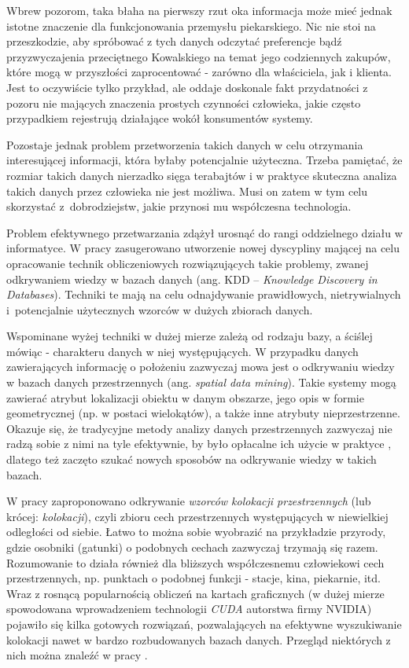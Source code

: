 \documentclass[12pt]{article}
\begin{document}
Wbrew pozorom, taka błaha na pierwszy rzut oka informacja może mieć jednak istotne znaczenie dla funkcjonowania przemysłu piekarskiego. Nic nie stoi na przeszkodzie, aby spróbować z tych danych odczytać preferencje bądź przyzwyczajenia przeciętnego Kowalskiego na temat jego codziennych zakupów, które mogą w przyszłości zaprocentować - zarówno dla właściciela, jak i klienta. Jest to oczywiście tylko przykład, ale oddaje doskonale fakt przydatności z pozoru nie mających znaczenia prostych czynności człowieka, jakie często przypadkiem rejestrują działające wokół konsumentów systemy.

Pozostaje jednak problem przetworzenia takich danych w celu otrzymania interesującej informacji, która byłaby potencjalnie użyteczna. Trzeba pamiętać, że rozmiar takich danych nierzadko sięga terabajtów i w praktyce skuteczna analiza takich danych przez człowieka nie jest możliwa. Musi on zatem w tym celu skorzystać z~dobrodziejstw, jakie przynosi mu współczesna technologia.

Problem efektywnego przetwarzania zdążył urosnąć do rangi oddzielnego działu w informatyce. W pracy \cite{kdd} zasugerowano utworzenie nowej dyscypliny mającej na celu opracowanie technik obliczeniowych rozwiązujących takie problemy, zwanej odkrywaniem wiedzy w bazach danych (ang. KDD – \textit{Knowledge Discovery in Databases}). Techniki te mają na celu odnajdywanie prawidłowych, nietrywialnych i~potencjalnie użytecznych wzorców w dużych zbiorach danych.

Wspominane wyżej techniki w dużej mierze zależą od rodzaju bazy, a ściślej mówiąc - charakteru danych w niej występujących. W przypadku danych zawierających informację o położeniu zazwyczaj mowa jest o  odkrywaniu wiedzy w bazach danych przestrzennych (ang. \textit{spatial data mining}). Takie systemy mogą zawierać atrybut lokalizacji obiektu w danym obszarze, jego opis w formie geometrycznej (np. w postaci wielokątów), a także inne atrybuty nieprzestrzenne. Okazuje się, że tradycyjne metody analizy danych przestrzennych zazwyczaj nie radzą sobie z nimi na tyle efektywnie, by było opłacalne ich użycie w praktyce \cite{trad}, dlatego też zaczęto szukać nowych sposobów na odkrywanie wiedzy w takich bazach.

W pracy \cite{huang} zaproponowano odkrywanie \textit{wzorców kolokacji przestrzennych} (lub krócej: \textit{kolokacji}), czyli zbioru cech przestrzennych występujących w niewielkiej odległości od siebie.  Łatwo to można sobie wyobrazić na przykładzie przyrody, gdzie osobniki (gatunki) o podobnych cechach zazwyczaj trzymają się razem. Rozumowanie to działa również dla bliższych współczesnemu człowiekowi cech przestrzennych, np. punktach o podobnej funkcji - stacje, kina, piekarnie, itd. Wraz z rosnącą popularnością obliczeń na kartach graficznych (w dużej mierze spowodowana wprowadzeniem technologii \textit{CUDA} autorstwa firmy NVIDIA) pojawiło się kilka gotowych rozwiązań, pozwalających na efektywne wyszukiwanie kolokacji nawet w bardzo rozbudowanych bazach danych. Przegląd niektórych z nich można znaleźć w pracy \cite{boinski}.
\end{document}
